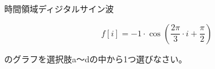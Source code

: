 時間領域ディジタルサイン波 

\[
f[i] = -1 \cdot \cos \left ( \frac{2 \pi}{3}  \cdot i + \frac{\pi}{2} \right )
\]

\noindent のグラフを選択肢a〜dの中から1つ選びなさい。
